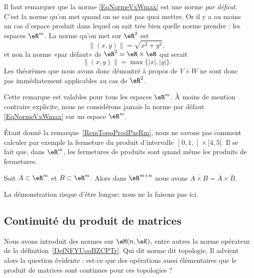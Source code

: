 \begin{remark}		\label{RemTopoProdPasRm}
	Il faut remarquer que la norme \eqref{EqNormeVxWmax} est une norme \emph{par défaut}. C'est la norme qu'on met quand on ne sait pas quoi mettre. Or il y a au moins un cas d'espace produit dans lequel on sait très bien quelle norme prendre : les espaces $\eR^m$. La norme qu'on met sur $\eR^2$ est
	\begin{equation}
		\| (x,y) \|=\sqrt{x^2+y^2},
	\end{equation}
	et non la norme «par défaut» de $\eR^2=\eR\times\eR$ qui serait
	\begin{equation}
		\| (x,y) \|=\max\{ | x |,| y | \}.
	\end{equation}
	Les théorèmes que nous avons donc démontré à propos de $V\times W$ ne sont donc pas immédiatement applicables au cas de $\eR^2$.

	Cette remarque est valables pour tous les espaces $\eR^m$. À moins de mention contraire explicite, nous ne considérons jamais la norme par défaut \eqref{EqNormeVxWmax} sur un espace $\eR^m$.
\end{remark}

Étant donné la remarque~\ref{RemTopoProdPasRm}, nous ne savons pas comment calculer par exemple la fermeture du produit d'intervalle $\mathopen] 0,1 ,  \mathclose[\times\mathopen[ 4 , 5 [$. Il se fait que, dans $\eR^m$, les fermetures de produits sont quand même les produits de fermetures.

\begin{proposition}		\label{PropovlAxBbarAbraB}
	Soit $A\subset\eR^m$ et $B\subset\eR^m$. Alors dans $\eR^{m+n}$ nous avons $\overline{ A\times B }=\bar A\times \bar B$.
\end{proposition}

La démonstration risque d'être longue; nous ne la faisons pas ici.

\subsection{Continuité du produit de matrices}
\label{SUBSECooOAWAooFcyUfI}

Nous avons introduit des normes sur \( \eM(n,\eK)\), entre autres la norme opérateur de la définition~\ref{DefNFYUooBZCPTr}. Qui dit norme dit topologie. Il advient alors la question évidente : est-ce que des opérations aussi élémentaires que le produit de matrices sont continues pour ces topologies ?

